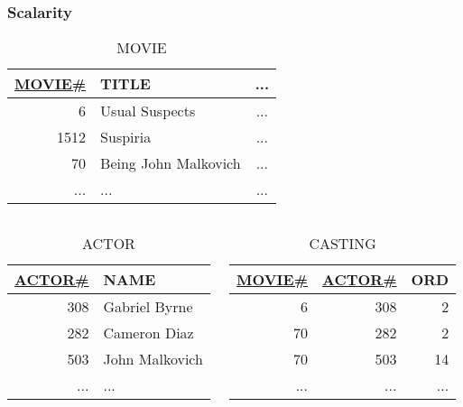\documentclass[dvipsnames]{beamer}
\theoremstyle{plain}
\begin{document}
\begin{frame}
  \frametitle{Scalarity}

  \begin{example}
    \begin{tiny}
    \begin{table}
      \caption{MOVIE}
      \begin{tabular}{|r|l|c|}\hline
\underline{MOVIE\#} & TITLE                & ...\\[2pt]\hline\hline
                  6 & Usual Suspects       & ...\\\hline
               1512 & Suspiria             & ...\\\hline
                 70 & Being John Malkovich & ...\\\hline
                ... & ...                  & ...\\\hline
      \end{tabular}
    \end{table}
    \end{tiny}

    \vspace{-12pt}
    \begin{columns}[t]
      \begin{tiny}
      \begin{table}
        \caption{ACTOR}
        \begin{tabular}{|r|l|}\hline
\underline{ACTOR\#} & NAME          \\[2pt]\hline\hline
                308 & Gabriel Byrne \\\hline
                282 & Cameron Diaz  \\\hline
                503 & John Malkovich\\\hline
                ... & ...           \\\hline
        \end{tabular}
      \end{table}
      \end{tiny}

      \begin{tiny}
      \begin{table}
        \caption{CASTING}
        \begin{tabular}{|r|r|r|}\hline
\underline{MOVIE\#} & \underline{ACTOR\#} & ORD\\[2pt]\hline\hline
                  6 &                 308 &   2\\\hline
                 70 &                 282 &   2\\\hline
                 70 &                 503 &  14\\\hline
                ... &                 ... & ...\\\hline
        \end{tabular}
      \end{table}
      \end{tiny}
    \end{columns}
  \end{example}
\end{frame}
\end{document}
